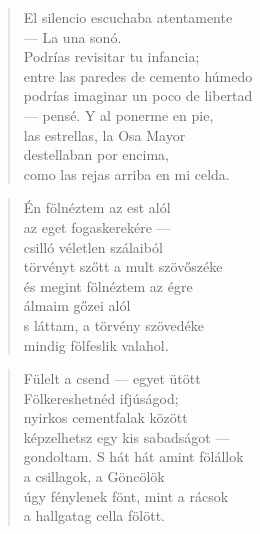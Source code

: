 \bigskip



\begin{verse}
  El silencio escuchaba atentamente \\
  --- La una sonó. \\
  Podrías revisitar tu infancia; \\
  entre las paredes de cemento húmedo \\
  podrías imaginar un poco de libertad \\
  --- pensé. Y al ponerme en pie, \\
  las estrellas, la Osa Mayor \\
  destellaban por encima, \\
  como las rejas arriba en mi celda. \\
\end{verse}

\newpage

\vspace*{-15mm}
\centeredornament



\begin{verse}
  Én fölnéztem az est alól \\
  az eget fogaskerekére --- \\
  csilló véletlen szálaiból \\
  törvényt szőtt a mult szövőszéke \\
  és megint fölnéztem az égre \\
  álmaim gőzei alól \\
  s láttam, a törvény szövedéke \\
  mindig fölfeslik valahol.
\end{verse}

\bigskip


\begin{verse}
  Fülelt a csend --- egyet ütött \\
  Fölkereshetnéd ifjúságod; \\
  nyirkos cementfalak között \\
  képzelhetsz egy kis sabadságot --- \\
  gondoltam. S hát hát amint fölállok \\
  a csillagok, a Göncölök \\
  úgy fénylenek fönt, mint a rácsok \\
  a hallgatag cella fölött.
\end{verse}

